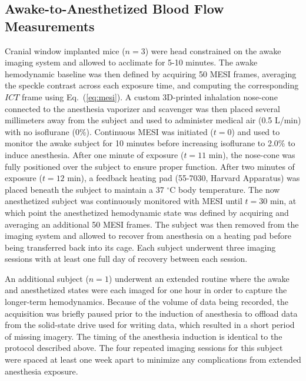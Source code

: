 \documentclass[12pt]{spieman}
\begin{document}
\begin{spacing}{2}

\subsection{Awake-to-Anesthetized Blood Flow Measurements}

Cranial window implanted mice ($n = 3$) were head constrained on the awake imaging system and allowed to acclimate for 5-10 minutes. The awake hemodynamic baseline was then defined by acquiring 50 MESI frames, averaging the speckle contrast across each exposure time, and computing the corresponding $ICT$ frame using Eq.~(\ref{eq:mesi}). A custom 3D-printed inhalation nose-cone connected to the anesthesia vaporizer and scavenger was then placed several millimeters away from the subject and used to administer medical air (0.5 L/min) with no isoflurane (0\%). Continuous MESI was initiated ($t = 0$) and used to monitor the awake subject for 10 minutes before increasing isoflurane to 2.0\% to induce anesthesia. After one minute of exposure ($t = 11$ min), the nose-cone was fully positioned over the subject to ensure proper function. After two minutes of exposure ($t = 12$ min), a feedback heating pad (55-7030, Harvard Apparatus) was placed beneath the subject to maintain a 37 $^\circ$C body temperature. The now anesthetized subject was continuously monitored with MESI until $t = 30$ min, at which point the anesthetized hemodynamic state was defined by acquiring and averaging an additional 50 MESI frames. The subject was then removed from the imaging system and allowed to recover from anesthesia on a heating pad before being transferred back into its cage. Each subject underwent three imaging sessions with at least one full day of recovery between each session.

An additional subject ($n = 1$) underwent an extended routine where the awake and anesthetized states were each imaged for one hour in order to capture the longer-term hemodynamics. Because of the volume of data being recorded, the acquisition was briefly paused prior to the induction of anesthesia to offload data from the solid-state drive used for writing data, which resulted in a short period of missing imagery. The timing of the anesthesia induction is identical to the protocol described above. The four repeated imaging sessions for this subject were spaced at least one week apart to minimize any complications from extended anesthesia exposure.


\end{spacing}
\end{document}
